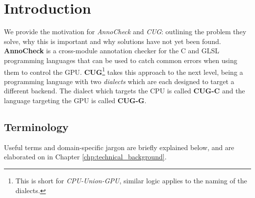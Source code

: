 \documentclass[a4paper,12pt,twoside,openright]{report}
\begin{document}
\pagestyle{empty}
\singlespacing

\onehalfspacing

\singlespacing

\singlespacing


\setcounter{page}{0}
\pagestyle{plain}
\tableofcontents

\onehalfspacing


\chapter{Introduction}
\setcounter{page}{1}

\label{sec:TODO}

We provide the motivation for \textit{AnnoCheck} and \textit{CUG}: outlining
the problem they solve, why this is important and why solutions have not yet
been found. \textbf{AnnoCheck} is a cross-module annotation checker for the C
and GLSL programming languages that can be used to catch common errors when
using them to control the GPU. \textbf{CUG}\footnote{This is short for
\textit{CPU-Union-GPU}, similar logic applies to the naming of the dialects.}
takes this approach to the next level, being a programming language with two
\textit{dialects} which are each designed to target a different backend. The
dialect which targets the CPU is called \textbf{CUG-C} and the language
targeting the GPU is called \textbf{CUG-G}.

\section{Terminology}

Useful terms and domain-specific jargon are briefly explained below, and are
elaborated on in Chapter \ref{chp:technical_background}.
\end{document}
